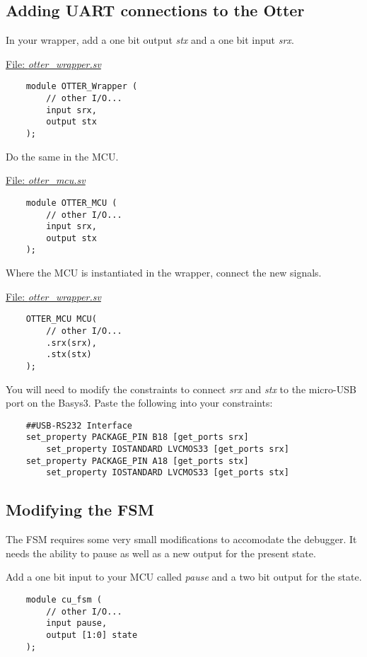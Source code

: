 \documentclass[10pt,a4paper]{article}
\begin{document}
\subsection{Adding UART connections to the Otter}

In your wrapper, add a one bit output \emph{stx} and a one bit input \emph{srx}.

\medskip
\noindent\underline{File: \emph{otter\_wrapper.sv}}
\begin{verbatim}
    module OTTER_Wrapper (
        // other I/O...
        input srx,
        output stx
    );
\end{verbatim}

\noindent Do the same in the MCU.

\medskip
\noindent\underline{File: \emph{otter\_mcu.sv}}
\begin{verbatim}
    module OTTER_MCU (
        // other I/O...
        input srx,
        output stx
    );
\end{verbatim}

\noindent Where the MCU is instantiated in the wrapper, connect the new signals.

\medskip
\noindent\underline{File: \emph{otter\_wrapper.sv}}
\begin{verbatim}
    OTTER_MCU MCU(
        // other I/O...
        .srx(srx),
        .stx(stx)
    );
\end{verbatim}

You will need to modify the constraints to connect \emph{srx} and \emph{stx} to the micro-USB port
on the Basys3. Paste the following into your constraints:

\begin{verbatim}
    ##USB-RS232 Interface
    set_property PACKAGE_PIN B18 [get_ports srx]						
        set_property IOSTANDARD LVCMOS33 [get_ports srx]
    set_property PACKAGE_PIN A18 [get_ports stx]						
        set_property IOSTANDARD LVCMOS33 [get_ports stx]
\end{verbatim}

\subsection{Modifying the FSM}
The FSM requires some very small modifications to accomodate the debugger. It needs the ability to
pause as well as a new output for the present state.

Add a one bit input to your MCU called \emph{pause} and a two bit output for the state.

\begin{verbatim}
    module cu_fsm (
        // other I/O...
        input pause,
        output [1:0] state
    );
\end{verbatim}
\end{document}
